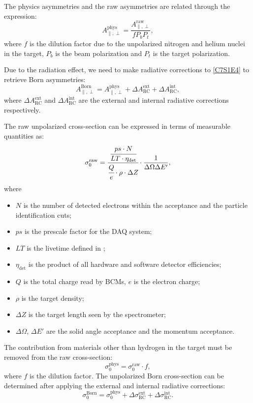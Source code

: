 The physics asymmetries and the raw asymmetries are related through the expression:
\begin{equation} \label{C7S1E4}
A_{\parallel,\perp}^{\mathrm{phys}}=\frac{A_{\parallel,\perp}^{\mathrm{raw}}}{fP_bP_t},
\end{equation}
where $f$ is the dilution factor due to the unpolarized nitrogen and helium nuclei in the target, $P_b$ is the beam polarization and $P_t$ is the target polarization.

Due to the radiation effect, we need to make radiative corrections to \cref{C7S1E4} to retrieve Born asymmetries:
\begin{equation} \label{C7S1E5}
A_{\parallel,\perp}^{\mathrm{Born}}=A_{\parallel,\perp}^{\mathrm{phys}}+\Delta A_{\mathrm{RC}}^{\mathrm{ext}}+\Delta A_{\mathrm{RC}}^{\mathrm{int}},
\end{equation}
where $\Delta A_{\mathrm{RC}}^{\mathrm{ext}}$ and $\Delta A_{\mathrm{RC}}^{\mathrm{int}}$ are the external and internal radiative corrections respectively.

The raw unpolarized cross-section can be expressed in terms of measurable quantities as:
\begin{equation} \label{C7S1E6}
\sigma_0^{\mathrm{raw}} = \cfrac{\cfrac{ps\cdot N}{LT\cdot\eta_{\mathrm{det}}}}{\cfrac{Q}{e}\cdot\rho\cdot\Delta Z }\cdot\frac{1}{\Delta\Omega\Delta E'},
\end{equation}
where
\begin{itemize}[parsep=0pt]
\item $N$ is the number of detected electrons within the acceptance and the particle identification cuts;
\item $ps$ is the prescale factor for the DAQ system;
\item $LT$ is the livetime defined in ;
\item $\eta_{\mathrm{det}}$ is the product of all hardware and software detector efficiencies;
\item $Q$ is the total charge read by BCMs, $e$ is the electron charge;
\item $\rho$ is the target density;
\item $\Delta Z$ is the target length seen by the spectrometer;
\item $\Delta\Omega$, $\Delta E'$ are the solid angle acceptance and the momentum acceptance.
\end{itemize}

The contribution from materials other than hydrogen in the target must be removed from the raw cross-section:
\begin{equation} \label{C7S1E7}
\sigma_0^{\mathrm{phys}} = \sigma_0^{\mathrm{raw}}\cdot f,
\end{equation}
where $f$ is the dilution factor. The unpolarized Born cross-section can be determined after applying the external and internal radiative corrections:
\begin{equation} \label{C7S1E8}
\sigma_0^{\mathrm{Born}} = \sigma_0^{\mathrm{phys}}+\Delta \sigma_{\mathrm{RC}}^{\mathrm{ext}}+\Delta \sigma_{\mathrm{RC}}^{\mathrm{int}}.
\end{equation}

